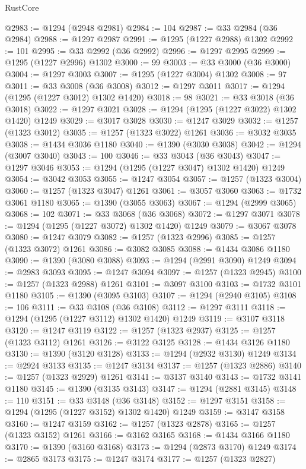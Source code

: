 \begin{lexlean}{RustCore}
\begin{coremodule}
@2983 := @1294 (@2948 @2981)
@2984 := 104
@2987 := @33 @2984 (@36 @2984)
@2988 := @1297 @2987
@2991 := @1295 (@1227 @2988) @1302
@2992 := 101
@2995 := @33 @2992 (@36 @2992)
@2996 := @1297 @2995
@2999 := @1295 (@1227 @2996) @1302
@3000 := 99
@3003 := @33 @3000 (@36 @3000)
@3004 := @1297 @3003
@3007 := @1295 (@1227 @3004) @1302
@3008 := 97
@3011 := @33 @3008 (@36 @3008)
@3012 := @1297 @3011
@3017 := @1294 (@1295 (@1227 @3012) @1302 @1420)
@3018 := 98
@3021 := @33 @3018 (@36 @3018)
@3022 := @1297 @3021
@3028 := @1294 (@1295 (@1227 @3022) @1302 @1420) @1249
@3029 := @3017 @3028
@3030 := @1247 @3029
@3032 := @1257 (@1323 @3012)
@3035 := @1257 (@1323 @3022) @1261
@3036 := @3032 @3035
@3038 := @1434 @3036 @1180
@3040 := @1390 (@3030 @3038)
@3042 := @1294 (@3007 @3040)
@3043 := 100
@3046 := @33 @3043 (@36 @3043)
@3047 := @1297 @3046
@3053 := @1294 (@1295 (@1227 @3047) @1302 @1420) @1249
@3054 := @3042 @3053
@3055 := @1247 @3054
@3057 := @1257 (@1323 @3004)
@3060 := @1257 (@1323 @3047) @1261
@3061 := @3057 @3060
@3063 := @1732 @3061 @1180
@3065 := @1390 (@3055 @3063)
@3067 := @1294 (@2999 @3065)
@3068 := 102
@3071 := @33 @3068 (@36 @3068)
@3072 := @1297 @3071
@3078 := @1294 (@1295 (@1227 @3072) @1302 @1420) @1249
@3079 := @3067 @3078
@3080 := @1247 @3079
@3082 := @1257 (@1323 @2996)
@3085 := @1257 (@1323 @3072) @1261
@3086 := @3082 @3085
@3088 := @1434 @3086 @1180
@3090 := @1390 (@3080 @3088)
@3093 := @1294 (@2991 @3090) @1249
@3094 := @2983 @3093
@3095 := @1247 @3094
@3097 := @1257 (@1323 @2945)
@3100 := @1257 (@1323 @2988) @1261
@3101 := @3097 @3100
@3103 := @1732 @3101 @1180
@3105 := @1390 (@3095 @3103)
@3107 := @1294 (@2940 @3105)
@3108 := 106
@3111 := @33 @3108 (@36 @3108)
@3112 := @1297 @3111
@3118 := @1294 (@1295 (@1227 @3112) @1302 @1420) @1249
@3119 := @3107 @3118
@3120 := @1247 @3119
@3122 := @1257 (@1323 @2937)
@3125 := @1257 (@1323 @3112) @1261
@3126 := @3122 @3125
@3128 := @1434 @3126 @1180
@3130 := @1390 (@3120 @3128)
@3133 := @1294 (@2932 @3130) @1249
@3134 := @2924 @3133
@3135 := @1247 @3134
@3137 := @1257 (@1323 @2886)
@3140 := @1257 (@1323 @2929) @1261
@3141 := @3137 @3140
@3143 := @1732 @3141 @1180
@3145 := @1390 (@3135 @3143)
@3147 := @1294 (@2881 @3145)
@3148 := 110
@3151 := @33 @3148 (@36 @3148)
@3152 := @1297 @3151
@3158 := @1294 (@1295 (@1227 @3152) @1302 @1420) @1249
@3159 := @3147 @3158
@3160 := @1247 @3159
@3162 := @1257 (@1323 @2878)
@3165 := @1257 (@1323 @3152) @1261
@3166 := @3162 @3165
@3168 := @1434 @3166 @1180
@3170 := @1390 (@3160 @3168)
@3173 := @1294 (@2873 @3170) @1249
@3174 := @2865 @3173
@3175 := @1247 @3174
@3177 := @1257 (@1323 @2827)

\end{coremodule}
\end{lexlean}
